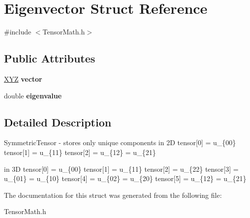 \hypertarget{structEigenvector}{
\section{Eigenvector Struct Reference}
\label{structEigenvector}
}


{\ttfamily \#include $<$TensorMath.h$>$}

\subsection*{Public Attributes}
\begin{DoxyCompactItemize}
\item 
\hypertarget{structEigenvector_a4fa23f309a687fc3175aa00d4cc0568c}{
\hyperlink{units_8h_af8792a2a2692e07997b2d4663199012b}{XYZ} {\bfseries vector}}
\label{structEigenvector_a4fa23f309a687fc3175aa00d4cc0568c}

\item 
\hypertarget{structEigenvector_a09ba16b39a58fd614e36206f37c4ffe6}{
double {\bfseries eigenvalue}}
\label{structEigenvector_a09ba16b39a58fd614e36206f37c4ffe6}

\end{DoxyCompactItemize}


\subsection{Detailed Description}
SymmetricTensor -\/ stores only unique components in 2D tensor\mbox{[}0\mbox{]} = u\_\-\{00\} tensor\mbox{[}1\mbox{]} = u\_\-\{11\} tensor\mbox{[}2\mbox{]} = u\_\-\{12\} = u\_\-\{21\}

in 3D tensor\mbox{[}0\mbox{]} = u\_\-\{00\} tensor\mbox{[}1\mbox{]} = u\_\-\{11\} tensor\mbox{[}2\mbox{]} = u\_\-\{22\} tensor\mbox{[}3\mbox{]} = u\_\-\{01\} = u\_\-\{10\} tensor\mbox{[}4\mbox{]} = u\_\-\{02\} = u\_\-\{20\} tensor\mbox{[}5\mbox{]} = u\_\-\{12\} = u\_\-\{21\} 

The documentation for this struct was generated from the following file:\begin{DoxyCompactItemize}
\item 
TensorMath.h\end{DoxyCompactItemize}
